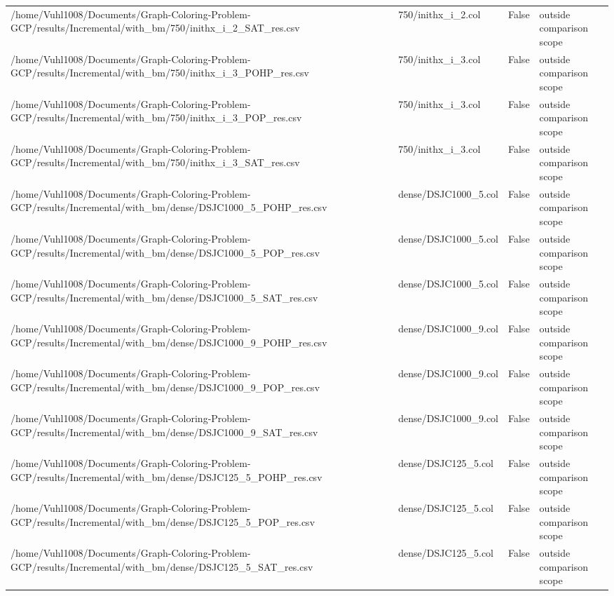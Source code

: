 \begin{table}[htbp]
\begin{tabular}{llll}
/home/Vuhl1008/Documents/Graph-Coloring-Problem-GCP/results/Incremental/with\_bm/750/inithx\_i\_2\_SAT\_res.csv & 750/inithx\_i\_2.col & False & outside comparison scope \\
/home/Vuhl1008/Documents/Graph-Coloring-Problem-GCP/results/Incremental/with\_bm/750/inithx\_i\_3\_POHP\_res.csv & 750/inithx\_i\_3.col & False & outside comparison scope \\
/home/Vuhl1008/Documents/Graph-Coloring-Problem-GCP/results/Incremental/with\_bm/750/inithx\_i\_3\_POP\_res.csv & 750/inithx\_i\_3.col & False & outside comparison scope \\
/home/Vuhl1008/Documents/Graph-Coloring-Problem-GCP/results/Incremental/with\_bm/750/inithx\_i\_3\_SAT\_res.csv & 750/inithx\_i\_3.col & False & outside comparison scope \\
/home/Vuhl1008/Documents/Graph-Coloring-Problem-GCP/results/Incremental/with\_bm/dense/DSJC1000\_5\_POHP\_res.csv & dense/DSJC1000\_5.col & False & outside comparison scope \\
/home/Vuhl1008/Documents/Graph-Coloring-Problem-GCP/results/Incremental/with\_bm/dense/DSJC1000\_5\_POP\_res.csv & dense/DSJC1000\_5.col & False & outside comparison scope \\
/home/Vuhl1008/Documents/Graph-Coloring-Problem-GCP/results/Incremental/with\_bm/dense/DSJC1000\_5\_SAT\_res.csv & dense/DSJC1000\_5.col & False & outside comparison scope \\
/home/Vuhl1008/Documents/Graph-Coloring-Problem-GCP/results/Incremental/with\_bm/dense/DSJC1000\_9\_POHP\_res.csv & dense/DSJC1000\_9.col & False & outside comparison scope \\
/home/Vuhl1008/Documents/Graph-Coloring-Problem-GCP/results/Incremental/with\_bm/dense/DSJC1000\_9\_POP\_res.csv & dense/DSJC1000\_9.col & False & outside comparison scope \\
/home/Vuhl1008/Documents/Graph-Coloring-Problem-GCP/results/Incremental/with\_bm/dense/DSJC1000\_9\_SAT\_res.csv & dense/DSJC1000\_9.col & False & outside comparison scope \\
/home/Vuhl1008/Documents/Graph-Coloring-Problem-GCP/results/Incremental/with\_bm/dense/DSJC125\_5\_POHP\_res.csv & dense/DSJC125\_5.col & False & outside comparison scope \\
/home/Vuhl1008/Documents/Graph-Coloring-Problem-GCP/results/Incremental/with\_bm/dense/DSJC125\_5\_POP\_res.csv & dense/DSJC125\_5.col & False & outside comparison scope \\
/home/Vuhl1008/Documents/Graph-Coloring-Problem-GCP/results/Incremental/with\_bm/dense/DSJC125\_5\_SAT\_res.csv & dense/DSJC125\_5.col & False & outside comparison scope \\

\end{tabular}
\end{table}
